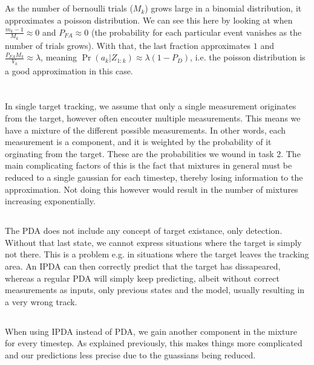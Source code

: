 \documentclass[]{article}
\begin{document}
\subsection{}
As the number of bernoulli trials ($M_k$) grows large in a binomial distribution, it approximates a poisson distribution. We can see this here by looking at when $\frac{m_k - 1}{M_k} \approx 0$ and $P_{FA} \approx 0$ (the probability for each particular event vanishes as the number of trials grows). With that, the last fraction approximates $1$ and $\frac{P_{FA}M_k}{V_k} \approx \lambda$, meaning $\Pr(a_k | Z_{1:k}) \approx \lambda (1 - P_D)$, i.e. the poisson distribution is a good approximation in this case.

\section{}
\subsection{}
In single target tracking, we assume that only a single measurement originates from the target, however often encouter multiple measurements. This means we have a mixture of the different possible measurements. In other words, each measurement is a component, and it is weighted by the probability of it orginating from the target. These are the probabilities we wound in task 2. The main complicating factors of this is the fact that mixtures in general must be reduced to a single gaussian for each timestep, thereby losing information to the approximation. Not doing this however would result in the number of mixtures increasing exponentially.

\subsection{}
The PDA does not include any concept of target existance, only detection. Without that last state, we cannot express situations where the target is simply not there. This is a problem e.g. in situations where the target leaves the tracking area. An IPDA can then correctly predict that the target has dissapeared, whereas a regular PDA will simply keep predicting, albeit without correct measurements as inputs, only previous states and the model, usually resulting in a very wrong track.

\subsection{}
When using IPDA instead of PDA, we gain another component in the mixture for every timestep. As explained previously, this makes things more complicated and our predictions less precise due to the guassians being reduced.
\end{document}
